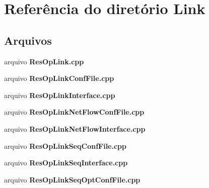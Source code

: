 \section{Referência do diretório Link}
\label{dir_f694cd4b9e5dddd4f9706fd93a0d950c}
\subsection*{Arquivos}
\begin{DoxyCompactItemize}
\item 
arquivo {\bf Res\+Op\+Link.\+cpp}
\item 
arquivo {\bf Res\+Op\+Link\+Conf\+File.\+cpp}
\item 
arquivo {\bf Res\+Op\+Link\+Interface.\+cpp}
\item 
arquivo {\bf Res\+Op\+Link\+Net\+Flow\+Conf\+File.\+cpp}
\item 
arquivo {\bf Res\+Op\+Link\+Net\+Flow\+Interface.\+cpp}
\item 
arquivo {\bf Res\+Op\+Link\+Seq\+Conf\+File.\+cpp}
\item 
arquivo {\bf Res\+Op\+Link\+Seq\+Interface.\+cpp}
\item 
arquivo {\bf Res\+Op\+Link\+Seq\+Opt\+Conf\+File.\+cpp}
\end{DoxyCompactItemize}
